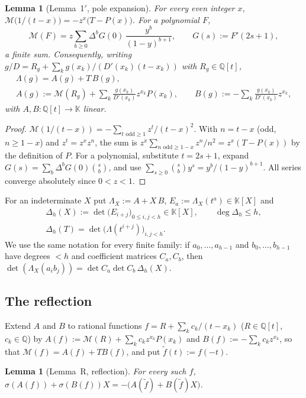 \documentclass[11pt]{amsart}
\newtheorem{lemma}[theorem]{Lemma}
\theoremstyle{definition}
\theoremstyle{remark}
\numberwithin{equation}{section}
\newcommand{\QQ}{\mathbb{Q}}
\newcommand{\KK}{\mathbb{K}}
\newcommand{\cM}{\mathcal{M}}
\begin{document}
\begin{lemma}[Lemma~1$'$, pole expansion]\label{lem:pole}
For every even integer $x$, $\cM\bigl(1/(t-x)\bigr)=-z^x\bigl(T-P(x)\bigr)$. For a polynomial $F$,
\begin{equation}\label{eq:mahler}
  \cM(F)=z\sum_{b\ge0}\Delta^bG(0)\,\frac{y^b}{(1-y)^{b+1}},\qquad G(s):=F'(2s+1),
\end{equation}
a finite sum. Consequently, writing $g/D=R_g+\sum_kg(x_k)/(D'(x_k)(t-x_k))$ with $R_g\in\QQ[t]$,
\begin{gather*}
  \Lambda(g)=A(g)+T\,B(g),\\
  A(g):=\cM(R_g)+\sum_k\frac{g(x_k)}{D'(x_k)}z^{x_k}P(x_k),\qquad
  B(g):=-\sum_k\frac{g(x_k)}{D'(x_k)}z^{x_k},
\end{gather*}
with $A,B\colon\QQ[t]\to\KK$ linear.
\end{lemma}

\begin{proof}
$\cM(1/(t-x))=-\sum_{t\text{ odd}\ge1}z^t/(t-x)^2$. With $n=t-x$ (odd, $n\ge1-x$) and $z^t=z^xz^n$, the sum is
$z^x\sum_{n\text{ odd}\ge1-x}z^n/n^2=z^x(T-P(x))$ by the definition of $P$. For a polynomial, substitute $t=2s+1$,
expand $G(s)=\sum_b\Delta^bG(0)\binom sb$, and use $\sum_{s\ge0}\binom sby^s=y^b/(1-y)^{b+1}$. All series converge
absolutely since $0<z<1$.
\end{proof}

For an indeterminate $X$ put $\Lambda_X:=A+X\,B$, $E_a:=\Lambda_X(t^a)\in\KK[X]$ and
\begin{gather*}
  \Delta_h(X):=\det\bigl(E_{i+j}\bigr)_{0\le i,j<h}\in\KK[X],\qquad\deg\Delta_h\le h,\\
  \Delta_h(T)=\det\bigl(\Lambda(t^{i+j})\bigr)_{i,j<h}.
\end{gather*}
We use the same notation for every finite family: if $a_0,\dots,a_{h-1}$ and $b_0,\dots,b_{h-1}$ have degrees $<h$ and
coefficient matrices $C_a,C_b$, then $\det(\Lambda_X(a_ib_j))=\det C_a\det C_b\,\Delta_h(X)$.

\subsection{The reflection}
Extend $A$ and $B$ to rational functions $f=R+\sum_kc_k/(t-x_k)$ ($R\in\QQ[t]$, $c_k\in\QQ$) by
$A(f):=\cM(R)+\sum_kc_kz^{x_k}P(x_k)$ and $B(f):=-\sum_kc_kz^{x_k}$, so that $\cM(f)=A(f)+TB(f)$, and put
$\tilde f(t):=f(-t)$.

\begin{lemma}[Lemma~R, reflection]\label{lem:R}
For every such $f$, $\sigma(A(f))+\sigma(B(f))X=-\bigl(A(\tilde f)+B(\tilde f)X\bigr)$.
\end{lemma}
\end{document}
